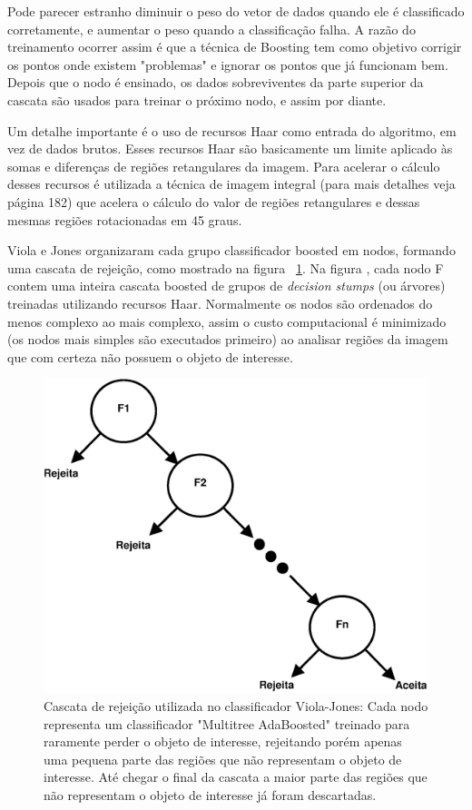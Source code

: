 Pode parecer estranho diminuir o peso do vetor de dados quando ele é classificado corretamente, e aumentar o peso quando a classificação falha. A razão do treinamento ocorrer assim é que a técnica de Boosting tem como objetivo corrigir os pontos onde existem "problemas" e ignorar os pontos que já funcionam bem. Depois que o nodo é ensinado, os dados sobreviventes da parte superior da cascata são usados para treinar o próximo nodo, e assim por diante.

Um detalhe importante é o uso de recursos Haar como entrada do algoritmo, em vez de dados brutos. Esses recursos Haar são basicamente um limite aplicado às somas e diferenças de regiões retangulares da imagem. Para acelerar o cálculo desses recursos é utilizada a técnica de imagem integral (para mais detalhes veja \cite{learningOpenCV} página 182) que acelera o cálculo do valor de regiões retangulares e dessas mesmas regiões rotacionadas em 45 graus. 

Viola e Jones organizaram cada grupo classificador boosted em nodos, formando uma cascata de rejeição, como mostrado na figura ~\ref{fig:cascata_rejeicao_haar}. Na figura , cada nodo F contem uma inteira cascata boosted de grupos de \textit{decision stumps} (ou árvores) treinadas utilizando recursos Haar. Normalmente os nodos são ordenados do menos complexo ao mais complexo, assim o custo computacional é minimizado (os nodos mais simples são executados primeiro) ao analisar regiões da imagem que com certeza não possuem o objeto de interesse.

\begin{figure}[H]
\centering
\includegraphics[scale=0.6]{imagens/fig8.eps}
\caption{Cascata de rejeição utilizada no classificador Viola-Jones: Cada nodo representa um classificador "Multitree AdaBoosted" treinado para raramente perder o objeto de interesse, rejeitando porém apenas uma pequena parte das regiões que não representam o objeto de interesse. Até chegar o final da cascata a maior parte das regiões que não representam o objeto de interesse já foram descartadas. }
\label{fig:cascata_rejeicao_haar}
\end{figure}



